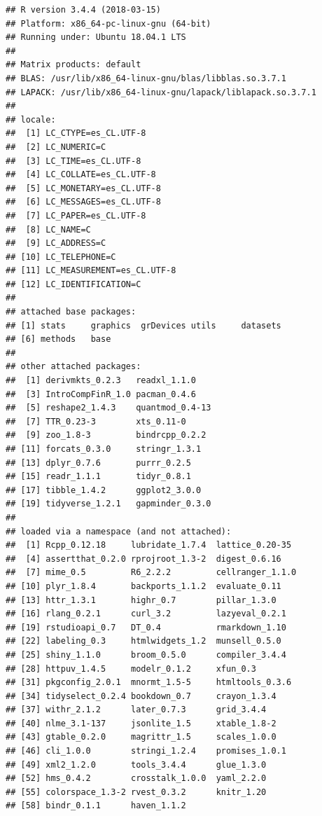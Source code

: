 \documentclass[12pt,]{book}
\begin{document}
\begin{verbatim}
## R version 3.4.4 (2018-03-15)
## Platform: x86_64-pc-linux-gnu (64-bit)
## Running under: Ubuntu 18.04.1 LTS
## 
## Matrix products: default
## BLAS: /usr/lib/x86_64-linux-gnu/blas/libblas.so.3.7.1
## LAPACK: /usr/lib/x86_64-linux-gnu/lapack/liblapack.so.3.7.1
## 
## locale:
##  [1] LC_CTYPE=es_CL.UTF-8      
##  [2] LC_NUMERIC=C              
##  [3] LC_TIME=es_CL.UTF-8       
##  [4] LC_COLLATE=es_CL.UTF-8    
##  [5] LC_MONETARY=es_CL.UTF-8   
##  [6] LC_MESSAGES=es_CL.UTF-8   
##  [7] LC_PAPER=es_CL.UTF-8      
##  [8] LC_NAME=C                 
##  [9] LC_ADDRESS=C              
## [10] LC_TELEPHONE=C            
## [11] LC_MEASUREMENT=es_CL.UTF-8
## [12] LC_IDENTIFICATION=C       
## 
## attached base packages:
## [1] stats     graphics  grDevices utils     datasets 
## [6] methods   base     
## 
## other attached packages:
##  [1] derivmkts_0.2.3   readxl_1.1.0     
##  [3] IntroCompFinR_1.0 pacman_0.4.6     
##  [5] reshape2_1.4.3    quantmod_0.4-13  
##  [7] TTR_0.23-3        xts_0.11-0       
##  [9] zoo_1.8-3         bindrcpp_0.2.2   
## [11] forcats_0.3.0     stringr_1.3.1    
## [13] dplyr_0.7.6       purrr_0.2.5      
## [15] readr_1.1.1       tidyr_0.8.1      
## [17] tibble_1.4.2      ggplot2_3.0.0    
## [19] tidyverse_1.2.1   gapminder_0.3.0  
## 
## loaded via a namespace (and not attached):
##  [1] Rcpp_0.12.18     lubridate_1.7.4  lattice_0.20-35 
##  [4] assertthat_0.2.0 rprojroot_1.3-2  digest_0.6.16   
##  [7] mime_0.5         R6_2.2.2         cellranger_1.1.0
## [10] plyr_1.8.4       backports_1.1.2  evaluate_0.11   
## [13] httr_1.3.1       highr_0.7        pillar_1.3.0    
## [16] rlang_0.2.1      curl_3.2         lazyeval_0.2.1  
## [19] rstudioapi_0.7   DT_0.4           rmarkdown_1.10  
## [22] labeling_0.3     htmlwidgets_1.2  munsell_0.5.0   
## [25] shiny_1.1.0      broom_0.5.0      compiler_3.4.4  
## [28] httpuv_1.4.5     modelr_0.1.2     xfun_0.3        
## [31] pkgconfig_2.0.1  mnormt_1.5-5     htmltools_0.3.6 
## [34] tidyselect_0.2.4 bookdown_0.7     crayon_1.3.4    
## [37] withr_2.1.2      later_0.7.3      grid_3.4.4      
## [40] nlme_3.1-137     jsonlite_1.5     xtable_1.8-2    
## [43] gtable_0.2.0     magrittr_1.5     scales_1.0.0    
## [46] cli_1.0.0        stringi_1.2.4    promises_1.0.1  
## [49] xml2_1.2.0       tools_3.4.4      glue_1.3.0      
## [52] hms_0.4.2        crosstalk_1.0.0  yaml_2.2.0      
## [55] colorspace_1.3-2 rvest_0.3.2      knitr_1.20      
## [58] bindr_0.1.1      haven_1.1.2
\end{verbatim}
\end{document}
